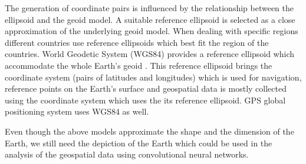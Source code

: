 The generation of coordinate pairs is influenced by the relationship between the ellipsoid and the geoid model. A suitable reference ellipsoid is selected as a close approximation of the underlying geoid model.
When dealing with specific regions different countries use reference ellipsoids which best fit the region of the countries.
World Geodetic System (WGS84) provides a reference ellipsoid which accommodate the whole Earth's geoid \cite{GISGEO_Ellipsoid}. This reference ellipsoid brings the coordinate system (pairs of latitudes and longitudes) which is used for navigation, reference points on the Earth's surface and geospatial data is mostly collected using the coordinate system which uses the its reference ellipsoid.
GPS global positioning system uses WGS84 as well\cite{GISGEO_WGS84}.



Even though the above models approximate the shape and the dimension of the Earth, we still need the depiction of the Earth which could be used in the analysis of the geospatial data using convolutional neural networks.